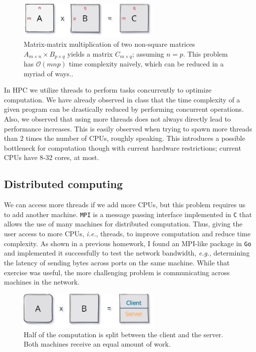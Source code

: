 \documentclass[12pt]{article}
\begin{document}
			\begin{figure}[b]
				\centering\includegraphics[width=0.618\textwidth]{../imgs/ABC}
				\caption{Matrix-matrix multiplication of two non-square matrices $A_{m\times n}\times B_{p\times q}$ yields a matrix $C_{m\times q}$; assuming $n=p$. This problem has $\mathcal{O}(mnp)$ time complexity naively, which can be reduced in a myriad of ways..}
				\label{fig:ABC}
			\end{figure}
			
			In HPC we utilize threads to perform tasks concurrently to optimize computation. We have already observed in class that the time complexity of a given program can be drastically reduced by performing concurrent operations. Also, we observed that using more threads does not always directly lead to performance increases. This is easily observed when trying to spawn more threads than 2 times the number of CPUs, roughly speaking. This introduces a possible bottleneck for computation though with current hardware restrictions; current CPUs have 8-32 cores, at most.
			
		\subsection*{Distributed computing} 
			We can access more threads if we add more CPUs, but this problem requires us to add another machine. \texttt{MPI} is a message passing interface implemented in \texttt{C} that allows the use of many machines for distributed computation. Thus, giving the user access to more CPUs, \textit{i.e.}, threads, to improve computation and reduce time complexity. As shown in a previous homework, I found an MPI-like package in \texttt{Go} and implemented it successfully to test the network bandwidth, \textit{e.g.}, determining the latency of sending bytes across ports on the same machine. While that exercise was useful, the more challenging problem is communicating across machines in the network.\\
			\begin{figure}
				\centering\includegraphics[width=0.618\textwidth]{../imgs/clientserver1}
				\caption{Half of the computation is split between the client and the server. Both machines receive an equal amount of work.}
				\label{fig:cs1}
			\end{figure}
		
\end{document}

